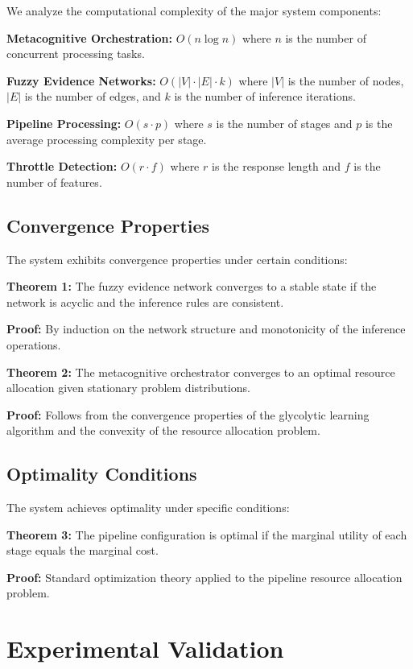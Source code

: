 \documentclass[12pt,a4paper]{article}
\begin{document}
We analyze the computational complexity of the major system components:

\textbf{Metacognitive Orchestration:} $O(n \log n)$ where $n$ is the number of concurrent processing tasks.

\textbf{Fuzzy Evidence Networks:} $O(|V| \cdot |E| \cdot k)$ where $|V|$ is the number of nodes, $|E|$ is the number of edges, and $k$ is the number of inference iterations.

\textbf{Pipeline Processing:} $O(s \cdot p)$ where $s$ is the number of stages and $p$ is the average processing complexity per stage.

\textbf{Throttle Detection:} $O(r \cdot f)$ where $r$ is the response length and $f$ is the number of features.

\subsection{Convergence Properties}

The system exhibits convergence properties under certain conditions:

\textbf{Theorem 1:} The fuzzy evidence network converges to a stable state if the network is acyclic and the inference rules are consistent.

\textbf{Proof:} By induction on the network structure and monotonicity of the inference operations.

\textbf{Theorem 2:} The metacognitive orchestrator converges to an optimal resource allocation given stationary problem distributions.

\textbf{Proof:} Follows from the convergence properties of the glycolytic learning algorithm and the convexity of the resource allocation problem.

\subsection{Optimality Conditions}

The system achieves optimality under specific conditions:

\textbf{Theorem 3:} The pipeline configuration is optimal if the marginal utility of each stage equals the marginal cost.

\textbf{Proof:} Standard optimization theory applied to the pipeline resource allocation problem.

\section{Experimental Validation}
\end{document}
